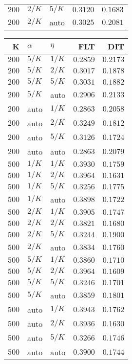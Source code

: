 \begin{table}
\begin{spacing}{1.2}
{\begin{tabular}{rll|rr}
$200$ &  $2/K$ &  $5/K$ &         $0.3120$ & $0.1683$ \\
$200$ &  $2/K$ &   auto &         $0.3025$ & $0.2081$ \\
\bottomrule
\end{tabular}
} \hfill \parbox{.45\linewidth}{\centering \begin{tabular}{rll|rr}
\toprule
    K &  $\alpha$ &    $\eta$ & FLT &        DIT \\
\midrule
$200$ &  $5/K$ &  $1/K$ &         $0.2859$ & $\bm{0.2173}$ \\
$200$ &  $5/K$ &  $2/K$ &         $0.3017$ &      $0.1878$ \\
$200$ &  $5/K$ &  $5/K$ &         $0.3031$ &      $0.1882$ \\
$200$ &  $5/K$ &   auto &         $0.2906$ &      $0.2133$ \\
$200$ &   auto &  $1/K$ &         $0.2863$ &      $0.2058$ \\
$200$ &   auto &  $2/K$ &         $0.3249$ &      $0.1812$ \\
$200$ &   auto &  $5/K$ &         $0.3126$ &      $0.1724$ \\
$200$ &   auto &   auto &         $0.2863$ &      $0.2079$ \\
\myrowcolor $500$ &  $1/K$ &  $1/K$ &         $0.3930$ &      $0.1759$ \\
$500$ &  $1/K$ &  $2/K$ &    $\bm{0.3964}$ &      $0.1631$ \\
$500$ &  $1/K$ &  $5/K$ &         $0.3256$ &      $0.1775$ \\
$500$ &  $1/K$ &   auto &         $0.3898$ &      $0.1722$ \\
$500$ &  $2/K$ &  $1/K$ &         $0.3905$ &      $0.1747$ \\
$500$ &  $2/K$ &  $2/K$ &         $0.3821$ &      $0.1680$ \\
$500$ &  $2/K$ &  $5/K$ &         $0.3244$ &      $0.1900$ \\
$500$ &  $2/K$ &   auto &         $0.3834$ &      $0.1760$ \\
$500$ &  $5/K$ &  $1/K$ &         $0.3860$ &      $0.1710$ \\
$500$ &  $5/K$ &  $2/K$ &         $0.3964$ &      $0.1609$ \\
$500$ &  $5/K$ &  $5/K$ &         $0.3246$ &      $0.1701$ \\
$500$ &  $5/K$ &   auto &         $0.3859$ &      $0.1801$ \\
$500$ &   auto &  $1/K$ &         $0.3943$ &      $0.1762$ \\
$500$ &   auto &  $2/K$ &         $0.3936$ &      $0.1630$ \\
$500$ &   auto &  $5/K$ &         $0.3266$ &      $0.1746$ \\
$500$ &   auto &   auto &         $0.3900$ &      $0.1744$ \\
\bottomrule
\end{tabular}
}
\end{spacing}
\end{table}

